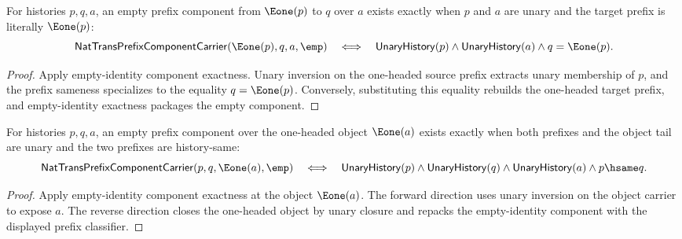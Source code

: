 \begin{theorem}
\label{thm:nattrans-prefix-component-e1-source-empty-component-exactness}
For histories $p,q,a$, an empty prefix component from $\Eone(p)$ to $q$ over
$a$ exists exactly when $p$ and $a$ are unary and the target prefix is literally
$\Eone(p)$:
$$
\mathsf{NatTransPrefixComponentCarrier}(\Eone(p),q,a,\emp)
\quad\Longleftrightarrow\quad
\mathsf{UnaryHistory}(p)\wedge\mathsf{UnaryHistory}(a)\wedge q=\Eone(p).
$$
\end{theorem}
\begin{proof}
Apply empty-identity component exactness. Unary inversion on the one-headed
source prefix extracts unary membership of $p$, and the prefix sameness
specializes to the equality $q=\Eone(p)$. Conversely, substituting this equality
rebuilds the one-headed target prefix, and empty-identity exactness packages
the empty component.
\end{proof}

\begin{theorem}
\label{thm:nattrans-prefix-component-e1-object-empty-component-iff}
For histories \(p,q,a\), an empty prefix component over the one-headed object
\(\Eone(a)\) exists exactly when both prefixes and the object tail are unary and
the two prefixes are history-same:
$$
\mathsf{NatTransPrefixComponentCarrier}(p,q,\Eone(a),\emp)
\quad\Longleftrightarrow\quad
\mathsf{UnaryHistory}(p)\wedge\mathsf{UnaryHistory}(q)\wedge
\mathsf{UnaryHistory}(a)\wedge p\hsame q.
$$
\end{theorem}
\begin{proof}
Apply empty-identity component exactness at the object \(\Eone(a)\). The forward
direction uses unary inversion on the object carrier to expose \(a\). The reverse
direction closes the one-headed object by unary closure and repacks the
empty-identity component with the displayed prefix classifier.
\end{proof}

